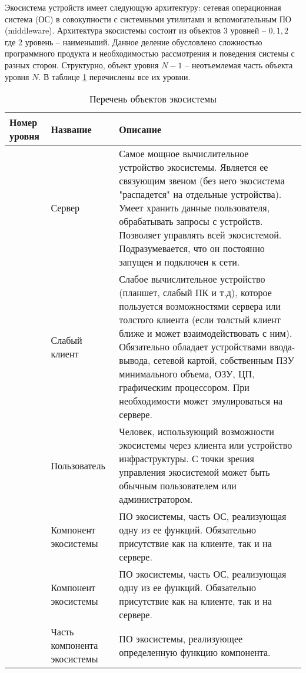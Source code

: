 Экосистема устройств имеет следующую архитектуру: сетевая операционная система (ОС) в совокупности с системными утилитами и вспомогательным ПО (middleware).
Архитектура экосистемы состоит из объектов 3 уровней -- \(0,1,2\) где 2 уровень -- наименьший. Данное деление обусловлено сложностью программного продукта и необходимостью рассмотрения и поведения системы с разных сторон. Структурно, объект уровня \(N-1\) -- неотъемлемая часть объекта уровня \(N\). В таблице \ref{table-objects} перечислены все их уровни.
\begin{table}[ht]
   \centering
   \begin{tabularx}{\textwidth}{|>{\centering}p{}|p{}|X|}
      \cline{1-3}
      Номер уровня & Название  & Описание \\ \hline
      0 & Сервер & Самое мощное вычислительное устройство экосистемы. Является ее связующим звеном (без него экосистема "распадется" на отдельные устройства). Умеет хранить данные пользователя, обрабатывать запросы с устройств. Позволяет управлять всей экосистемой. Подразумевается, что он постоянно запущен и подключен к сети. \\ \hline
      0 & Слабый клиент & Слабое вычислительное устройство (планшет, слабый ПК и т.д), которое пользуется возможностями сервера или толстого клиента (если толстый клиент ближе и может взаимодействовать с ним). Обязательно обладает устройствами ввода-вывода, сетевой картой, собственным ПЗУ минимального объема, ОЗУ, ЦП, графическим процессором. При необходимости может эмулироваться на сервере. \\ \hline
      0 & Пользователь & Человек, использующий возможности экосистемы через клиента или устройство инфраструктуры. С точки зрения управления экосистемой может быть обычным пользователем или администратором. \\ \hline
      1 & Компонент экосистемы & ПО экосистемы, часть ОС, реализующая одну из ее функций. Обязательно присутствие как на клиенте, так и на сервере. \\ \hline
      1 & Компонент экосистемы & ПО экосистемы, часть ОС, реализующая одну из ее функций. Обязательно присутствие как на клиенте, так и на сервере. \\ \hline
      2 & Часть компонента экосистемы & ПО экосистемы, реализующее определенную функцию компонента. \\ \hline
   \end{tabularx}
   \caption{Перечень объектов экосистемы}
   \label{table-objects}
\end{table}


